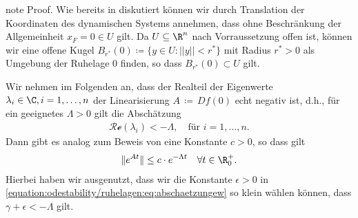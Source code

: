 \documentclass[letterpaper,10pt,german]{jupyterBook}
\begin{document}
\begin{sphinxadmonition}{note}
\sphinxAtStartPar
Proof. Wie bereits in {\hyperref[\detokenize{odestability/ruhelagen:s-linearisierung-ruhelage}]{}} diskutiert können wir durch Translation der Koordinaten des dynamischen Systems annehmen, dass ohne Beschränkung der Allgemeinheit \(x_F = 0 \in U\) gilt.
Da \(U\subseteq\R^n\) nach Vorraussetzung offen ist, können wir eine offene Kugel \(B_{{r^\ast}}(0) \coloneqq \{y \in U \colon ||y|| < {r^\ast}\}\) mit Radius \({r^\ast} > 0\) als Umgebung der Ruhelage \(0\) finden, so dass \(B_{r^\ast}(0) \subset U\) gilt.

\sphinxAtStartPar
Wir nehmen im Folgenden an, dass der Realteil der Eigenwerte \(\lambda_i \in \C, i=1,\ldots,n\) der Linearisierung \(A \, \coloneqq \, Df(0)\) echt negativ ist, d.h., für ein geeignetes \(\Lambda > 0\) gilt die Abschätzung
\begin{equation*}
\begin{split}\mathcal{Re}(\lambda_i)< -\Lambda, \quad \text{für } i=1,\ldots,n. \end{split}
\end{equation*}
\sphinxAtStartPar
Dann gibt es analog zum Beweis von {\hyperref[\detokenize{odestability/ruhelagen:thm:stablin}]{}} eine Konstante \(c>0\), so dass gilt
\begin{equation}\label{equation:odestability/ruhelagen:eq:normexp}
\begin{split}\|e^{At}\| \leq c\cdot e^{-\Lambda t}\quad \forall t\in \R^+_0.\end{split}
\end{equation}
\sphinxAtStartPar
Hierbei haben wir ausgenutzt, dass wir die Konstante \(\epsilon > 0\) in \eqref{equation:odestability/ruhelagen:eq:abschaetzungew} so klein wählen können, dass \(\gamma + \epsilon < -\Lambda\) gilt.


\end{sphinxadmonition}
\end{document}
